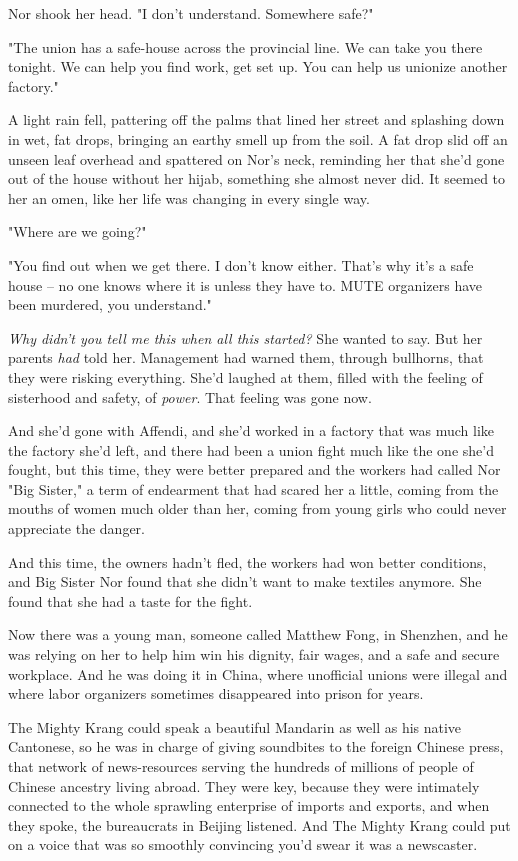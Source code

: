 Nor shook her head. "I don't understand. Somewhere safe?"

"The union has a safe-house across the provincial line. We can take
you there tonight. We can help you find work, get set up. You can
help us unionize another factory."

A light rain fell, pattering off the palms that lined her street
and splashing down in wet, fat drops, bringing an earthy smell up
from the soil. A fat drop slid off an unseen leaf overhead and
spattered on Nor's neck, reminding her that she'd gone out of the
house without her hijab, something she almost never did. It seemed
to her an omen, like her life was changing in every single way.

"Where are we going?"

"You find out when we get there. I don't know either. That's why
it's a safe house -- no one knows where it is unless they have to.
MUTE organizers have been murdered, you understand."

\emph{Why didn't you tell me this when all this started?} She
wanted to say. But her parents \emph{had} told her. Management had
warned them, through bullhorns, that they were risking everything.
She'd laughed at them, filled with the feeling of sisterhood and
safety, of \emph{power}. That feeling was gone now.

And she'd gone with Affendi, and she'd worked in a factory that was
much like the factory she'd left, and there had been a union fight
much like the one she'd fought, but this time, they were better
prepared and the workers had called Nor "Big Sister," a term of
endearment that had scared her a little, coming from the mouths of
women much older than her, coming from young girls who could never
appreciate the danger.

And this time, the owners hadn't fled, the workers had won better
conditions, and Big Sister Nor found that she didn't want to make
textiles anymore. She found that she had a taste for the fight.

Now there was a young man, someone called Matthew Fong, in
Shenzhen, and he was relying on her to help him win his dignity,
fair wages, and a safe and secure workplace. And he was doing it in
China, where unofficial unions were illegal and where labor
organizers sometimes disappeared into prison for years.

The Mighty Krang could speak a beautiful Mandarin as well as his
native Cantonese, so he was in charge of giving soundbites to the
foreign Chinese press, that network of news-resources serving the
hundreds of millions of people of Chinese ancestry living abroad.
They were key, because they were intimately connected to the whole
sprawling enterprise of imports and exports, and when they spoke,
the bureaucrats in Beijing listened. And The Mighty Krang could put
on a voice that was so smoothly convincing you'd swear it was a
newscaster.

